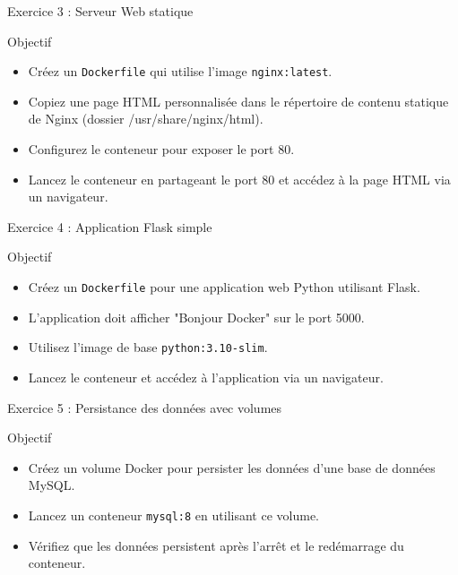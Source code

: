 \documentclass{beamer}
\begin{document}
\begin{frame}{Exercice 3 : Serveur Web statique}
\begin{block}{Objectif}
\begin{itemize}
  \item Créez un \texttt{Dockerfile} qui utilise l'image \texttt{nginx:latest}.
  \item Copiez une page HTML personnalisée dans le répertoire de contenu statique de Nginx (dossier /usr/share/nginx/html).
  \item Configurez le conteneur pour exposer le port 80.
  \item Lancez le conteneur en partageant le port 80 et accédez à la page HTML via un navigateur.
\end{itemize}
\end{block}
\end{frame}

\begin{frame}{Exercice 4 : Application Flask simple}
\begin{block}{Objectif}
\begin{itemize}
  \item Créez un \texttt{Dockerfile} pour une application web Python utilisant Flask.
  \item L'application doit afficher "Bonjour Docker" sur le port 5000.
  \item Utilisez l'image de base \texttt{python:3.10-slim}.
  \item Lancez le conteneur et accédez à l'application via un navigateur.
\end{itemize}
\end{block}
\end{frame}

\begin{frame}{Exercice 5 : Persistance des données avec volumes}
\begin{block}{Objectif}
\begin{itemize}
  \item Créez un volume Docker pour persister les données d'une base de données MySQL.
  \item Lancez un conteneur \texttt{mysql:8} en utilisant ce volume.
  \item Vérifiez que les données persistent après l'arrêt et le redémarrage du conteneur.
\end{itemize}
\end{block}
\end{frame}
\end{document}

